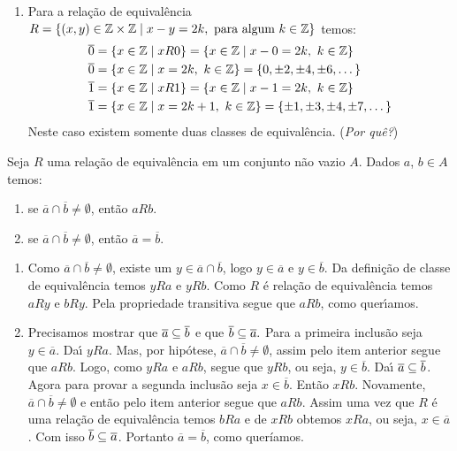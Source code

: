 \begin{exemplos}
\begin{enumerate}[label={\arabic*})]
		\item Para a relação de equivalência $R = \{(x,y)\in \mathbb{Z} \times \mathbb{Z} \mid x - y = 2k, \mbox{ para algum } k \in \mathbb{Z}\}$ temos:
		\begin{align*}
			\overline{0} &= \{x \in \mathbb{Z} \mid xR0 \} = \{x \in \mathbb{Z} \mid x - 0 = 2k,\ k \in \mathbb{Z}\} \\ 
			\overline{0} &= \{x \in \mathbb{Z} \mid x = 2k,\ k \in \mathbb{Z}\} = \{0, \pm 2, \pm 4, \pm 6, \dots\}\\
			\overline{1} &= \{x \in \mathbb{Z} \mid xR1 \} = \{x \in \mathbb{Z} \mid x - 1 = 2k,\ k \in \mathbb{Z}\} \\
			\overline{1} &= \{x \in \mathbb{Z} \mid x = 2k + 1,\ k \in \mathbb{Z}\} = \{\pm 1, \pm 3, \pm 4, \pm 7, \dots\}\\
		\end{align*}
		Neste caso existem somente duas classes de equivalência. (\textit{Por quê?})
	\end{enumerate}
\end{exemplos}

\begin{proposicao}
	Seja $R$ uma rela{\c c}{\~a}o de equival{\^e}ncia em um conjunto n{\~a}o vazio $A$. Dados $a$, $b \in A$ temos:
	\begin{enumerate}[label={\roman*})]
		\item se $\overline{a} \cap \overline{b} \ne \emptyset$, ent{\~a}o $aRb$.
		\item se  $\overline{a} \cap \overline{b} \neq \emptyset$, ent{\~a}o $\overline{a} = \overline{b}$.
	\end{enumerate}
\end{proposicao}
\begin{prova}
	\begin{enumerate}[label={\roman*})]
		\item Como  $\overline{a} \cap \overline{b} \ne \emptyset$, existe um $y \in \overline{a} \cap \overline{b}$, logo $y \in \overline{a}$ e $y \in \overline{b}$. Da defini{\c c}{\~a}o de classe de equival{\^e}ncia temos $yRa$ e $yRb$. Como $R$ {\'e} rela{\c c}{\~a}o de equival{\^e}ncia temos $aRy$ e $bRy$. Pela propriedade transitiva segue que $aRb$, como quer{\'\i}amos.

		\item Precisamos mostrar que $\overline{a} \subseteq \overline{b}$ e que $\overline{b} \subseteq \overline{a}.$ Para a primeira inclusão seja $y \in \overline{a}$. Da{\'\i} $yRa$. Mas, por hipótese, $\overline{a}\cap\overline{b}\neq\emptyset$, assim pelo item anterior segue que $aRb$. Logo, como $yRa$ e $aRb$, segue que $yRb$, ou seja, $y \in \overline{b}$. Da{\'\i} $\overline{a}\subseteq\overline{b}$. Agora para provar a segunda inclusão seja $x \in \overline{b}$. Então $xRb$. Novamente, $\overline{a} \cap \overline{b} \ne \emptyset$ e então pelo item anterior segue que $aRb$. Assim uma vez que $R$ é uma relação de equivalência temos $bRa$ e de $xRb$ obtemos $xRa$, ou seja, $x \in \overline{a}$. Com isso $\overline{b} \subseteq \overline{a}$. Portanto $\overline{a} = \overline{b}$, como queríamos.
	\end{enumerate}
\end{prova}

